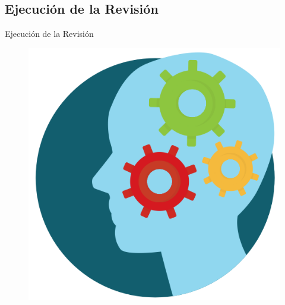 \documentclass{beamer}
\begin{document}
\subsection{Ejecución de la Revisión} %
\begin{frame}
\Huge{\centerline{Ejecución de la Revisión}}
	\begin{figure}[H]
		\begin{center}
		    \includegraphics[scale=.3]{images/2icons/execute.png}
	    \end{center}
	\end{figure}
\end{frame}
\end{document}
